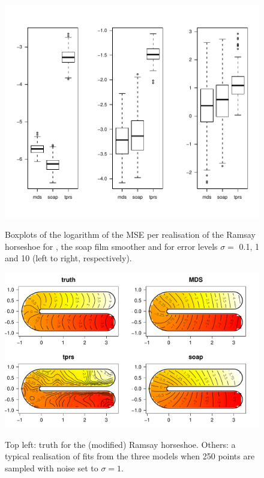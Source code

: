 \begin{figure}
\centering
\includegraphics[width=6in, trim=0in 0.5in 0in 0in]{mds/figs/mds-ramsay-boxplot.pdf} \\
\caption{Boxplots of the logarithm of the MSE per realisation of the Ramsay horseshoe for \mdsap, the soap film smoother and \tprs for error levels $\sigma=$ 0.1, 1 and 10 (left to right, respectively).}
\label{mds-ramsay-boxplot}
\end{figure}

\begin{figure}
\centering
\includegraphics[width=6in]{mds/figs/ramsay-fit-1.pdf} \\
\caption{Top left: truth for the (modified) Ramsay horseshoe. Others: a typical realisation of fits from the three models when 250 points are sampled with noise set to $\sigma=1$.}
\label{mds-ramsay-fit-1}
\end{figure}

